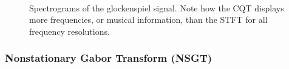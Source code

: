 \documentclass[report.tex]{subfiles}
\begin{document}
\begin{figure}[ht]
	\\
	\caption{Spectrograms of the glockenspiel signal. Note how the CQT displays more frequencies, or musical information, than the STFT for all frequency resolutions.}
	\label{fig:cqtvstft}
\end{figure}

\newpagefill

\subsubsection{Nonstationary Gabor Transform (NSGT)}
\label{sec:theorynsgt}
\end{document}
